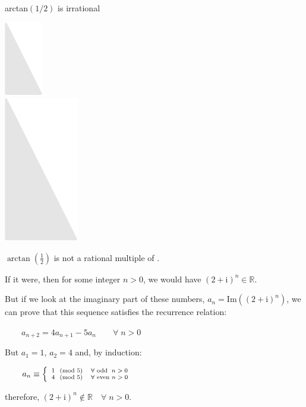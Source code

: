 \documentclass[14pt]{beamer}
\begin{document}
    \begin{frame}{arctan$(1/2)$ is irrational}
        \begin{center}
            \begin{minipage}{0.45\textwidth}%
                \includegraphics[scale=0.38]{figures/figure024a.pdf} \\[2ex]
                \includegraphics[scale=0.38]{figures/figure024b.pdf} \\
            \end{minipage}\hfill\begin{minipage}{0.5\textwidth}
                \footnotesize

                $\arctan(\tfrac{1}{2})$ is not a rational multiple of \textpi.\bigskip

                If it were, then for some integer $n>0$, we would have $(2\!+\!\text{i})^n \in \mathbb{R}$.\bigskip

                But if we look at the imaginary part of these numbers, $a_n = \text{Im}((2\!+\!\text{i})^n)$, we can prove that this sequence satisfies the recurrence relation:\bigskip

                $\qquad a_{n+2} = 4 a_{n+1} - 5 a_n\qquad \forall\; n > 0$\bigskip

                But $a_1 = 1$, $a_2 = 4$ and, by induction:\bigskip

                $\qquad a_n \equiv \left\{ {\scriptsize  \begin{array}{ll}
                                                        1\;\pmod{5} & \forall\text{ odd }\; n > 0\\
                                                        4\;\pmod{5} & \forall\text{ even } n > 0\\
                                                    \end{array}}\right. $\bigskip

                therefore, $(2\!+\!\text{i})^n \notin \mathbb{R} \quad \forall\; n > 0$.\bigskip
            \end{minipage}
        \end{center}
    \end{frame}
\end{document}
